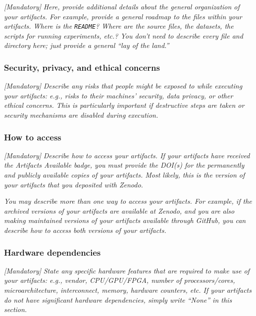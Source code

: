 \emph{[Mandatory]}
%
\emph{Here, provide additional details about the general organization
of your artifacts.  For example, provide a general roadmap to the
files within your artifacts.  Where is the \texttt{README}?  Where are
the source files, the datasets, the scripts for running experiments,
etc.?  You don't need to describe every file and directory here; just
provide a general ``lay of the land.''}


\subsubsection{Security, privacy, and ethical concerns}

\emph{[Mandatory]}
%
\emph{Describe any risks that people might be exposed to while
executing your artifacts: e.g., risks to their machines' security,
data privacy, or other ethical concerns.  This is particularly
important if destructive steps are taken or security mechanisms are
disabled during execution.}


\subsubsection{How to access}

\emph{[Mandatory]}
%
\emph{Describe how to access your artifacts.  If your artifacts have
received the \emph{Artifacts Available} badge, you must provide the
DOI(s) for the permanently and publicly available copies of your
artifacts.  Most likely, this is the version of your artifacts that
you deposited with Zenodo.}

\emph{You may describe more than one way to access your artifacts.
For example, if the archived versions of your artifacts are available
at Zenodo, and you are also making maintained versions of your
artifacts available through GitHub, you can describe how to access
both versions of your artifacts.}


\subsubsection{Hardware dependencies}

\emph{[Mandatory]}
%
\emph{State any specific hardware features that are required to make
use of your artifacts: e.g., vendor, CPU/GPU/FPGA, number of
processors/cores, microarchitecture, interconnect, memory, hardware
counters, etc.  If your artifacts do not have significant hardware
dependencies, simply write ``None'' in this section.}

